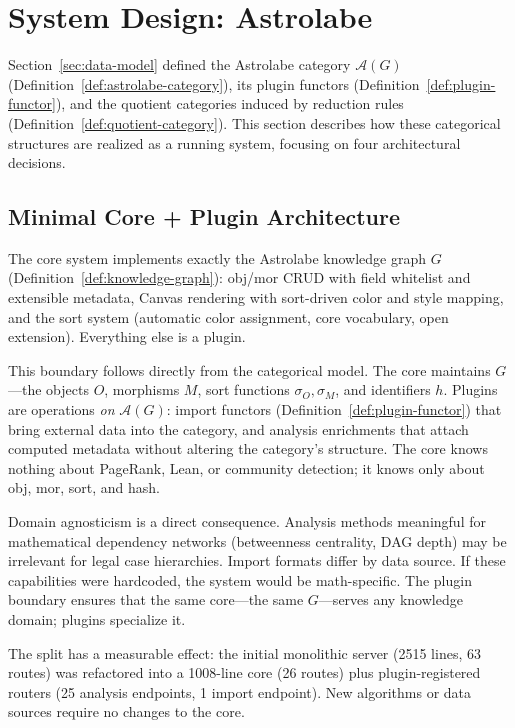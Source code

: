 \section{System Design: Astrolabe}
\label{sec:system}


Section~\ref{sec:data-model} defined the Astrolabe category $\mathcal{A}(G)$ (Definition~\ref{def:astrolabe-category}), its plugin functors (Definition~\ref{def:plugin-functor}), and the quotient categories induced by reduction rules (Definition~\ref{def:quotient-category}). This section describes how these categorical structures are realized as a running system, focusing on four architectural decisions.


\subsection{Minimal Core + Plugin Architecture}
\label{sec:sys-core}

The core system implements exactly the Astrolabe knowledge graph $G$ (Definition~\ref{def:knowledge-graph}): obj/mor CRUD with field whitelist and extensible metadata, Canvas rendering with sort-driven color and style mapping, and the sort system (automatic color assignment, core vocabulary, open extension). Everything else is a plugin.

This boundary follows directly from the categorical model. The core maintains $G$---the objects $O$, morphisms $M$, sort functions $\sigma_O, \sigma_M$, and identifiers $h$. Plugins are operations \emph{on} $\mathcal{A}(G)$: import functors (Definition~\ref{def:plugin-functor}) that bring external data into the category, and analysis enrichments that attach computed metadata without altering the category's structure. The core knows nothing about PageRank, Lean, or community detection; it knows only about obj, mor, sort, and hash.

Domain agnosticism is a direct consequence. Analysis methods meaningful for mathematical dependency networks (betweenness centrality, DAG depth) may be irrelevant for legal case hierarchies. Import formats differ by data source. If these capabilities were hardcoded, the system would be math-specific. The plugin boundary ensures that the same core---the same $G$---serves any knowledge domain; plugins specialize it.

The split has a measurable effect: the initial monolithic server (2515 lines, 63 routes) was refactored into a 1008-line core (26 routes) plus plugin-registered routers (25 analysis endpoints, 1 import endpoint). New algorithms or data sources require no changes to the core.



